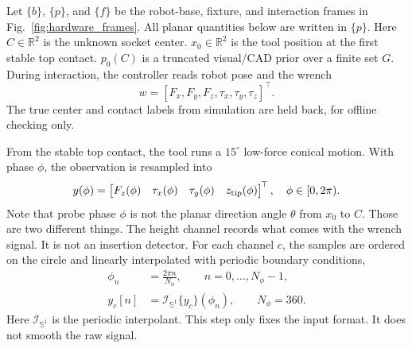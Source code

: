 \documentclass[letterpaper,10 pt,conference]{ieeeconf}
\newcommand{\R}{\mathbb{R}}
\begin{document}
Let $\{b\}$, $\{p\}$, and $\{f\}$ be the robot-base, fixture, and
interaction frames in Fig.~\ref{fig:hardware_frames}.  All planar
quantities below are written in $\{p\}$.  Here $C\in\R^2$ is the unknown
socket center.  $x_0\in\R^2$ is the tool position at the first stable top
contact.  $p_0(C)$ is a truncated visual/CAD prior over a finite set $G$.
During interaction, the controller reads robot pose and the wrench
\begin{equation}
w=[F_x,F_y,F_z,\tau_x,\tau_y,\tau_z]^\top .
\label{eq:wrench}
\end{equation}
The true center and contact labels from simulation are held back, for
offline checking only.

From the stable top contact, the tool runs a $15^\circ$ low-force conical
motion.  With phase $\phi$, the observation is resampled into
\begin{equation}
y(\phi)=
\begin{bmatrix}
F_z(\phi)&\tau_x(\phi)&\tau_y(\phi)&z_{\rm tip}(\phi)
\end{bmatrix}^{\!\top},
\quad \phi\in[0,2\pi).
\label{eq:fingerprint}
\end{equation}
Note that probe phase $\phi$ is not the planar direction angle $\theta$
from $x_0$ to $C$.  Those are two different things.  The height channel
records what comes with the wrench signal.  It is not an insertion
detector.  For each channel $c$, the samples are ordered on the circle and
linearly interpolated with periodic boundary conditions,
\begin{equation}
\begin{aligned}
\phi_n&=\frac{2\pi n}{N_\phi},\qquad n=0,\ldots,N_\phi-1,\\
y_c[n]&=\mathcal I_{\mathbb S^1}\{y_c\}(\phi_n),\qquad N_\phi=360.
\end{aligned}
\label{eq:phase_resampling}
\end{equation}
Here $\mathcal I_{\mathbb S^1}$ is the periodic interpolant.  This step
only fixes the input format.  It does not smooth the raw signal.
\end{document}
